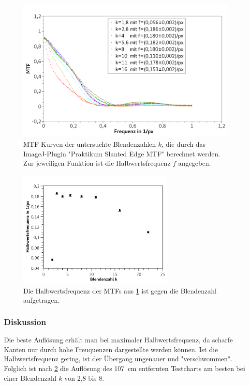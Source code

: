 \documentclass[
	a4paper,
	12pt,
	pagesize,
	ngerman
]{scrartcl}
\begin{document}
	\begin{figure}[H]  
		\includegraphics[width=1\textwidth]{fig_schraeg_kant}
		\centering
		\caption{
			MTF-Kurven der untersuchte Blendenzahlen $k$, die durch das ImageJ-Plugin "Praktikum Slanted Edge MTF" berechnet werden.
			Zur jeweiligen Funktion ist die Halbwertsfrequenz $f$ angegeben.
			}
		\label{fig_schraeg_kante_mtf}
		\centering
	\end{figure}

	\begin{figure}[H]  
		\includegraphics[width=0.7\textwidth]{fig_schraeg_kant_2}
		\centering
		\caption{
			Die Halbwertsfrequenz der MTFs aus \cref{fig_schraeg_kante_mtf} ist gegen die Blendenzahl aufgetragen.
			}
		\label{fig_schraeg_kante}
		\centering
	\end{figure}

	\subsubsection{Diskussion}
	Die beste Auflösung erhält man bei maximaler Halbwertsfrequenz, da scharfe Kanten nur durch hohe Freuquenzen dargestellte werden können. 
	Ist die Halbwertsfrequenz gering, ist der Übergang ungenauer und "verschwommen".
	Folglich ist nach \cref{fig_schraeg_kante} die Auflösung des \SI{107}{cm} entfernten Testcharts am besten bei einer Blendenzahl $k$ von 2,8 bis 8.
	
\end{document}
